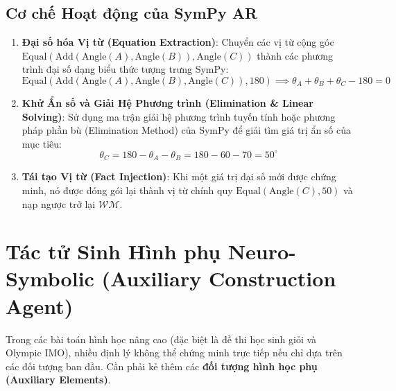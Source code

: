 \subsection{Cơ chế Hoạt động của SymPy AR}
\begin{enumerate}
    \item \textbf{Đại số hóa Vị từ (Equation Extraction)}: Chuyển các vị từ cộng góc $\text{Equal}(\text{Add}(\text{Angle}(A), \text{Angle}(B)), \text{Angle}(C))$ thành các phương trình đại số dạng biểu thức tượng trưng SymPy:
    $$\text{Equal}(\text{Add}(\text{Angle}(A), \text{Angle}(B), \text{Angle}(C)), 180) \implies \theta_A + \theta_B + \theta_C - 180 = 0$$
    \item \textbf{Khử Ẩn số và Giải Hệ Phương trình (Elimination \& Linear Solving)}: Sử dụng ma trận giải hệ phương trình tuyến tính hoặc phương pháp phần bù (Elimination Method) của SymPy để giải tìm giá trị ẩn số của mục tiêu:
    $$\theta_C = 180 - \theta_A - \theta_B = 180 - 60 - 70 = 50^\circ$$
    \item \textbf{Tái tạo Vị từ (Fact Injection)}: Khi một giá trị đại số mới được chứng minh, nó được đóng gói lại thành vị từ chính quy $\text{Equal}(\text{Angle}(C), 50)$ và nạp ngược trở lại $\mathcal{WM}$.
\end{enumerate}

\section{Tác tử Sinh Hình phụ Neuro-Symbolic (Auxiliary Construction Agent)}
Trong các bài toán hình học nâng cao (đặc biệt là đề thi học sinh giỏi và Olympic IMO), nhiều định lý không thể chứng minh trực tiếp nếu chỉ dựa trên các đối tượng ban đầu. Cần phải kẻ thêm các \textbf{đối tượng hình học phụ (Auxiliary Elements)}.

